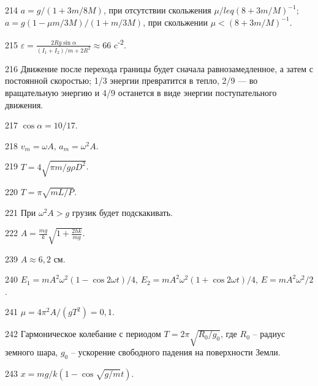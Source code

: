 \begin{Answer}{214}
$a = g/(1+3m/8M)$, при отсутствии скольжения $\mu /leq (8+3m/M)^{-1}$; $a = g(1 - \mu m/3M)/(1+m/3M)$, при скольжении $\mu < (8+3m/M)^{-1}$.
\end{Answer}
\begin{Answer}{215}
$\varepsilon = \frac{2Rg \sin \alpha}{(I_1 + I_2)/m + 2R^2} \approx 66$ c\textsuperscript{-2}.
\end{Answer}
\begin{Answer}{216}
Движение после перехода границы будет сначала равнозамедленное, а затем с постоянной скоростью; 1/3 энергии превратится в тепло, 2/9 — во вращательную энергию и 4/9 останется в виде энергии поступательного движения.
\end{Answer}
\begin{Answer}{217}
$\cos \alpha = 10/17$.
\end{Answer}
\begin{Answer}{218}
$v_m = \omega A$, $a_m = \omega^2 A$.
\end{Answer}
\begin{Answer}{219}
$T = 4 \sqrt{\pi m / g \rho D^2}$.
\end{Answer}
\begin{Answer}{220}
$T = \pi \sqrt{m L /P}$.
\end{Answer}
\begin{Answer}{221}
При $\omega^2 A > g$ грузик будет подскакивать.
\end{Answer}
\begin{Answer}{222}
$A = \frac{mg}{k}\sqrt{ 1 + \frac{2hk}{mg}}$.
\end{Answer}
\begin{Answer}{239}
$A \approx 6,2$ см.
\end{Answer}
\begin{Answer}{240}
$E_1 = m A^2 \omega^2 (1 - \cos 2 \omega t)/4$, $E_2 = m A^2 \omega^2 (1 + \cos 2 \omega t)/4$, $E = m A^2 \omega^2 /2$.
\end{Answer}
\begin{Answer}{241}
$\mu = 4 \pi^2 A / (gT^2) = 0,1$.
\end{Answer}
\begin{Answer}{242}
Гармоническое колебание с периодом $T = 2 \pi \sqrt{R_0 / g_0}$, где $R_0$ -- радиус земного шара, $g_0$ -- ускорение свободного падения на поверхности Земли.
\end{Answer}
\begin{Answer}{243}
$x = mg/k(1-\cos \sqrt{g/m} t)$.
\end{Answer}
